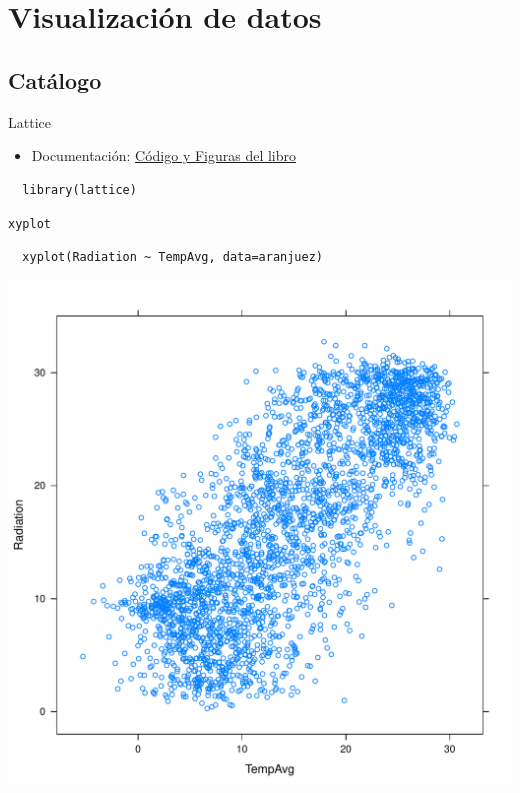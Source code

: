 \documentclass[xcolor={usenames,svgnames,dvipsnames}]{beamer}
\begin{document}
\section{Visualización de datos}
\label{sec-6}
\subsection{Catálogo}
\label{sec-6-1}

\begin{frame}[fragile,label=sec-6-1-1]{Lattice}
 \begin{itemize}
\item Documentación: \href{http://lmdvr.r-forge.r-project.org/figures/figures.html}{Código y Figuras del libro}
\end{itemize}

\lstset{language=R,label= ,caption= ,numbers=none}
\begin{lstlisting}
  library(lattice)
\end{lstlisting}
\end{frame}

\begin{frame}[fragile,label=sec-6-1-2]{\texttt{xyplot}}
 \lstset{language=R,label= ,caption= ,numbers=none}
\begin{lstlisting}
  xyplot(Radiation ~ TempAvg, data=aranjuez)
\end{lstlisting}
\end{frame}

\begin{frame}[label=sec-6-1-3]{}
\includegraphics[width=.9\linewidth]{figs/xyplot.pdf}
\end{frame}
\end{document}
